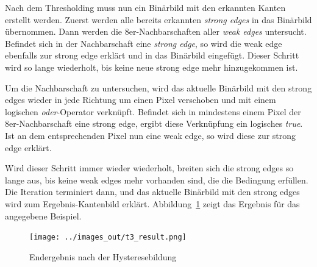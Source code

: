 Nach dem Thresholding muss nun ein Binärbild mit den erkannten Kanten erstellt werden. Zuerst werden alle bereits erkannten \emph{strong edges} in das Binärbild übernommen. Dann werden die 8er-Nachbarschaften aller \emph{weak edges} untersucht. Befindet sich in der Nachbarschaft eine \emph{strong edge}, so wird die weak edge ebenfalls zur strong edge erklärt und in das Binärbild eingefügt. Dieser Schritt wird so lange wiederholt, bis keine neue strong edge mehr hinzugekommen ist.

Um die Nachbarschaft zu untersuchen, wird das aktuelle Binärbild mit den strong edges wieder in jede Richtung um einen Pixel verschoben und mit einem logischen \emph{oder}-Operator verknüpft. Befindet sich in mindestens einem Pixel der 8er-Nachbarschaft eine strong edge, ergibt diese Verknüpfung ein logisches \emph{true}. Ist an dem entsprechenden Pixel nun eine weak edge, so wird diese zur strong edge erklärt.

Wird dieser Schritt immer wieder wiederholt, breiten sich die strong edges so lange aus, bis keine weak edges mehr vorhanden sind, die die Bedingung erfüllen. Die Iteration terminiert dann, und das aktuelle Binärbild mit den strong edges wird zum Ergebnis-Kantenbild erklärt. Abbildung~\ref{fig:t3_result} zeigt das Ergebnis für das angegebene Beispiel.

\smallskip

\begin{figure}[htb]
 \centering
 \texttt{[image: ../images\_out/t3\_result.png]}
 \caption{Endergebnis nach der Hysteresebildung}
 \label{fig:t3_result}
\end{figure}

\clearpage




%
%

\FloatBarrier\label{end-of-document}


